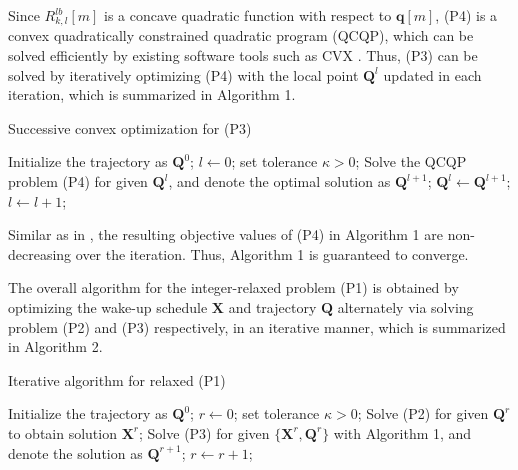 \documentclass[journal]{IEEEtran}
\begin{document}
Since $R_{k,l}^{lb}[m]$ is a concave quadratic function with respect to $\mathbf{q}[m]$, (P4) is a convex quadratically constrained quadratic program (QCQP), which can be solved efficiently by existing software tools such as CVX \cite{MGrant}. Thus, (P3) can be solved by iteratively optimizing (P4)
with the local point $\mathbf{Q}^{l}$ updated in each iteration, which is summarized in Algorithm 1. \vspace{-0.1in}
\begin{algorithm}[h]
\caption{Successive convex optimization for (P3)}
\begin{algorithmic}[1]
\State Initialize the trajectory as $\mathbf{Q}^{0}$;
\State $l\leftarrow 0$; set tolerance $\kappa>0$;
\Repeat
\State Solve the QCQP problem (P4) for given $\mathbf{Q}^{l}$, and denote the optimal solution as $\mathbf{Q}^{l+1}$;
\State $\mathbf{Q}^{l}\leftarrow \mathbf{Q}^{l+1}$; $l \leftarrow l + 1$;
\label{code:recentEnd}
\end{algorithmic}
\end{algorithm}\vspace{-0.12in}

Similar as in \cite{YZeng}, the resulting objective
values of (P4) in Algorithm 1 are non-decreasing over the iteration. Thus, Algorithm 1 is guaranteed to converge.

The overall algorithm for the integer-relaxed problem (P1) is obtained by optimizing the wake-up schedule $\mathbf{X}$ and trajectory $\mathbf{Q}$
alternately via solving problem (P2) and (P3)
respectively, in an iterative manner, which is summarized in Algorithm 2. \vspace{-0.1in}
\begin{algorithm}[h]
\caption{Iterative algorithm for relaxed (P1)}
\begin{algorithmic}[1]
\State Initialize the trajectory as $\mathbf{Q}^{0}$;
\State $r\leftarrow 0$; set tolerance $\kappa>0$;
\Repeat
\State Solve (P2) for given $\mathbf{Q}^{r}$ to obtain solution $\mathbf{X}^{r}$;
\State Solve (P3) for given $\{\mathbf{X}^{r},\mathbf{Q}^{r}\}$ with Algorithm 1, and denote the solution as $\mathbf{Q}^{r+1}$;
\State $r \leftarrow r + 1$;
\label{code:recentEnd}
\end{algorithmic}
\end{algorithm}\vspace{-0.12in}
\end{document}
